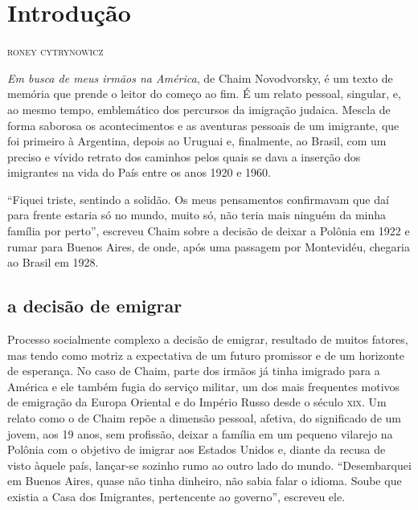\newcommand{\subtitulo}[1]{\NoCaseChange{\textnormal{\break\Large\itshape#1}}}
\chapter*{Introdução\smallskip\subtitulo{Os percursos da imigração judaica}}

\begin{flushright}
\textsc{roney cytrynowicz}
\end{flushright}\medskip

\noindent{}\textit{Em busca de meus irmãos na América}, de Chaim
Novodvorsky, é um texto de memória que prende o leitor do começo ao fim.
É um relato pessoal, singular, e, ao mesmo tempo, emblemático dos
percursos da imigração judaica. Mescla de forma saborosa os
acontecimentos e as aventuras pessoais de um imigrante, que foi primeiro
à Argentina, depois ao Uruguai e, finalmente, ao Brasil, com um preciso
e vívido retrato dos caminhos pelos quais se dava a inserção dos
imigrantes na vida do País entre os anos 1920 e 1960.

``Fiquei triste, sentindo a solidão. Os meus pensamentos confirmavam que
daí para frente estaria só no mundo, muito só, não teria mais ninguém da
minha família por perto'', escreveu Chaim sobre a decisão de deixar a
Polônia em 1922 e rumar para Buenos Aires, de onde, após uma passagem
por Montevidéu, chegaria ao Brasil em 1928. 

\section{a decisão de emigrar}

Processo socialmente
complexo a decisão de emigrar, resultado de muitos fatores, mas tendo
como motriz a expectativa de um futuro promissor e de um horizonte de
esperança. No caso de Chaim, parte dos irmãos já tinha imigrado para a
América e ele também fugia do serviço militar, um dos mais frequentes
motivos de emigração da Europa Oriental e do Império Russo desde o
século \textsc{xix}. Um relato como o de Chaim repõe a dimensão pessoal, afetiva, do
significado de um jovem, aos 19 anos, sem profissão, deixar a família em
um pequeno vilarejo na Polônia com o objetivo de imigrar aos Estados
Unidos e, diante da recusa de visto àquele país, lançar-se sozinho rumo
ao outro lado do mundo. ``Desembarquei em Buenos Aires, quase não tinha
dinheiro, não sabia falar o idioma. Soube que existia a Casa dos
Imigrantes, pertencente ao governo'', escreveu ele.

